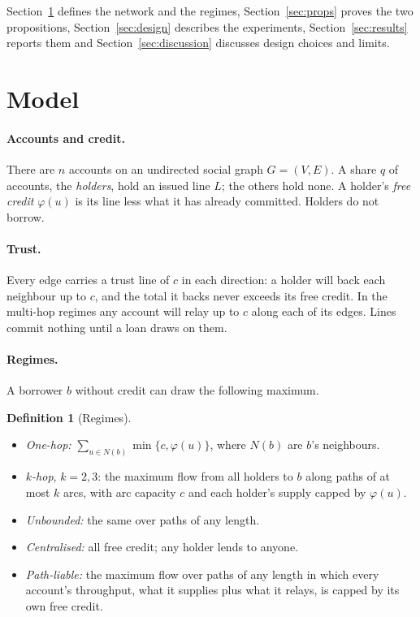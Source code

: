 \documentclass[11pt]{article}
\theoremstyle{plain}
\theoremstyle{definition}
\newtheorem{definition}{Definition}
\begin{document}
Section~\ref{sec:model} defines the network and the regimes, Section~\ref{sec:props} proves the two
propositions, Section~\ref{sec:design} describes the experiments, Section~\ref{sec:results} reports
them and Section~\ref{sec:discussion} discusses design choices and limits.

\section{Model}\label{sec:model}

\paragraph{Accounts and credit.} There are $n$ accounts on an undirected social graph $G=(V,E)$. A
share $q$ of accounts, the \emph{holders}, hold an issued line $L$; the others hold none. A holder's
\emph{free credit} $\varphi(u)$ is its line less what it has already committed. Holders do not borrow.

\paragraph{Trust.} Every edge carries a trust line of $c$ in each direction: a holder will back each
neighbour up to $c$, and the total it backs never exceeds its free credit. In the multi-hop regimes
any account will relay up to $c$ along each of its edges. Lines commit nothing until a loan draws on
them.

\paragraph{Regimes.} A borrower $b$ without credit can draw the following maximum.

\begin{definition}[Regimes]\label{def:regimes}
\begin{itemize}
\item \emph{One-hop:} $\sum_{u\in N(b)}\min\{c,\varphi(u)\}$, where $N(b)$ are $b$'s neighbours.
\item \emph{$k$-hop}, $k=2,3$: the maximum flow from all holders to $b$ along paths of at most $k$
  arcs, with arc capacity $c$ and each holder's supply capped by $\varphi(u)$.
\item \emph{Unbounded:} the same over paths of any length.
\item \emph{Centralised:} all free credit; any holder lends to anyone.
\item \emph{Path-liable:} the maximum flow over paths of any length in which every account's
  throughput, what it supplies plus what it relays, is capped by its own free credit.
\end{itemize}
\end{definition}
\end{document}
